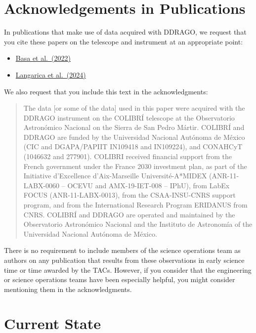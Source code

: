 \section{Acknowledgements in Publications}

In publications that make use of data acquired with DDRAGO, we request that you cite these papers on the telescope and instrument at an appropriate point:

\begin{itemize}
\item \href{https://ui.adsabs.harvard.edu/abs/2022SPIE12182E..1SB/abstract}{Basa et al.\ (2022)}
\item \href{https://ui.adsabs.harvard.edu/abs/2024SPIE13096E..3DL/abstract}{Langarica et al.\ (2024)}

\end{itemize}

We also request that you include this text in the acknowledgments:

\begin{quote}
The data [or some of the data] used in this paper were acquired with the DDRAGO instrument on the COLIBRÍ telescope at the Observatorio Astronómico Nacional on the Sierra de San Pedro Mártir. COLIBRÍ and DDRAGO are funded by the Universidad Nacional Autónoma de México (CIC and DGAPA/PAPIIT IN109418 and IN109224), and CONAHCyT (1046632 and 277901). COLIBRI received financial support from the French government under the France 2030 investment plan, as part of the Initiative d’Excellence d’Aix-Marseille Université-A*MIDEX  (ANR-11-LABX-0060 -- OCEVU and AMX-19-IET-008 -- IPhU), from LabEx FOCUS (ANR-11-LABX-0013), from the CSAA-INSU-CNRS support program, and from the International Research Program ERIDANUS from CNRS. COLIBRÍ and DDRAGO are operated and maintained by the Observatorio Astronómico Nacional and the Instituto de Astronomía of the Universidad Nacional Autónoma de México.
\end{quote}

There is no requirement to include members of the science operations team as authors on any publication that results from these observations in early science time or time awarded by the TACs. However, if you consider that the engineering or science operations teams have been especially helpful, you might consider mentioning them in the acknowledgments.

\section{Current State}

